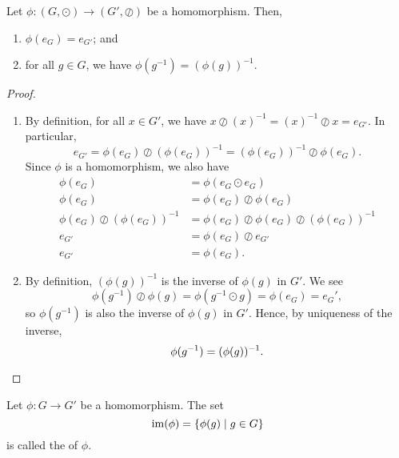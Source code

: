 \begin{prop}
Let $ \phi:(G,\odot)\to(G',\oslash) $ be a homomorphism. Then,
\begin{enumerate}
    \item $ \phi(e_G)=e_{G'} $; and
    \item for all $ g\in G $, we have $ \phi(g^{-1})=(\phi(g))^{-1} $.
\end{enumerate}
\end{prop}
\begin{proof}~
\begin{enumerate}
    \item By definition, for all $ x\in G' $, we have $ x\oslash(x)^{-1}=(x)^{-1}\oslash x=e_{G'} $. In particular,
    \begin{equation*}
        e_{G'}=\phi(e_G)\oslash(\phi(e_G))^{-1}=(\phi(e_G))^{-1}\oslash\phi(e_G).
    \end{equation*}
    Since $ \phi $ is a homomorphism, we also have
    \begin{align*}
        \phi(e_G) &= \phi(e_G\odot e_G) \\
        \phi(e_G) &= \phi(e_G)\oslash\phi(e_G) \\
        \phi(e_G)\oslash(\phi(e_G))^{-1} &= \phi(e_G)\oslash\phi(e_G)\oslash(\phi(e_G))^{-1} \\
        e_{G'} &= \phi(e_G)\oslash e_{G'} \\
        e_{G'} &= \phi(e_G).
    \end{align*}

    \item By definition, $ (\phi(g))^{-1} $ is the inverse of $ \phi(g) $ in $ G' $. We see
    \begin{equation*}
        \phi(g^{-1})\oslash\phi(g)=\phi(g^{-1}\odot g)=\phi(e_G)=e_G',
    \end{equation*}
    so $ \phi(g^{-1}) $ is also the inverse of $ \phi(g) $ in $ G' $. Hence, by uniqueness of the inverse,
    \begin{equation*}
        \phi(g^{-1})=(\phi(g))^{-1}. \qedhere
    \end{equation*}
\end{enumerate}
\end{proof}

\begin{defn}
Let $ \phi:G\to G' $ be a homomorphism. The set 
\begin{equation*}
    \operatorname{im}(\phi)=\{\phi(g)\mid g\in G\}
\end{equation*}
is called the  of $ \phi $.
\end{defn}

